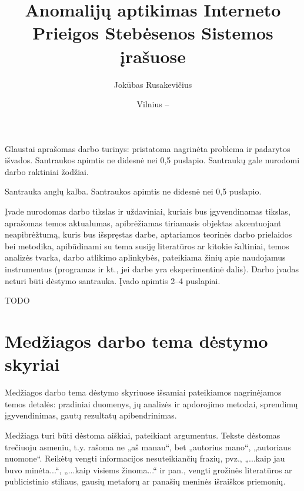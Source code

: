 \documentclass{VUMIFPSbakalaurinis}
\title{Anomalijų aptikimas Interneto Prieigos Stebėsenos Sistemos įrašuose}
\author{Jokūbas Rusakevičius}
\date{Vilnius – \the\year}
\begin{document}
\maketitle

\setcounter{page}{2}


Glaustai aprašomas darbo turinys: pristatoma nagrinėta problema ir padarytos
išvados. Santraukos apimtis ne didesnė nei 0,5 puslapio. Santraukų gale
nurodomi darbo raktiniai žodžiai. 

Santrauka anglų kalba. Santraukos apimtis ne didesnė nei 0,5 puslapio.

\tableofcontents

Įvade nurodomas darbo tikslas ir uždaviniai, kuriais bus įgyvendinamas tikslas,
aprašomas temos aktualumas, apibrėžiamas tiriamasis objektas akcentuojant
neapibrėžtumą, kuris bus išspręstas darbe, aptariamos teorinės darbo prielaidos
bei metodika, apibūdinami su tema susiję literatūros ar kitokie šaltiniai,
temos analizės tvarka, darbo atlikimo aplinkybės, pateikiama žinių apie
naudojamus instrumentus (programas ir kt., jei darbe yra eksperimentinė dalis).
Darbo įvadas neturi būti dėstymo santrauka. Įvado apimtis 2–4 puslapiai.

TODO

\section{Medžiagos darbo tema dėstymo skyriai}
Medžiagos darbo tema dėstymo skyriuose išsamiai pateikiamos nagrinėjamos temos
detalės: pradiniai duomenys, jų analizės ir apdorojimo metodai, sprendimų
įgyvendinimas, gautų rezultatų apibendrinimas.

Medžiaga turi būti dėstoma aiškiai, pateikiant argumentus. Tekste dėstomas
trečiuoju asmeniu, t.y. rašoma ne „aš manau“, bet „autorius mano“, „autoriaus
nuomone“. Reikėtų vengti informacijos nesuteikiančių frazių, pvz., „...kaip jau
buvo minėta...“, „...kaip visiems žinoma...“ ir pan., vengti grožinės
literatūros ar publicistinio stiliaus, gausių metaforų ar panašių meninės
išraiškos priemonių.
\end{document}
